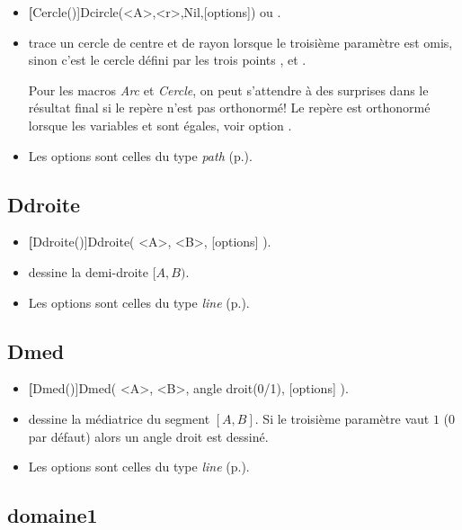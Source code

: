 \begin{itemize}
 \item \util \textbf[Cercle()]{Dcircle(<A>,<r>,Nil,[options])} ou .
 \item \desc trace un cercle de centre  et de rayon  lorsque le troisième paramètre est omis, sinon c'est le cercle défini par les trois points ,  et .

 Pour les macros \emph{Arc} et \emph{Cercle}, on peut s'attendre à des surprises dans le résultat final si le repère n'est pas orthonormé! Le repère est orthonormé lorsque les variables  et  sont égales, voir option .
 \item Les options sont celles du type \emph{path} (p.\pageref{typepath}).
\end{itemize}


\subsection{Ddroite}

\begin{itemize}
 \item \util \textbf[Ddroite()]{Ddroite( <A>, <B>, [options] )}.
 \item \desc dessine la demi-droite $[A,B)$.
 \item Les options sont celles du type \emph{line} (p.\pageref{typeline}).
\end{itemize} 

\subsection{Dmed}

\begin{itemize}
 \item \util \textbf[Dmed()]{Dmed( <A>, <B>, angle droit(0/1), [options] )}.
 \item \desc dessine la médiatrice du segment $[A,B]$. Si le troisième paramètre vaut $1$ ($0$ par défaut) alors un angle droit est dessiné.
 \item Les options sont celles du type \emph{line} (p.\pageref{typeline}).
\end{itemize} 


\subsection{domaine1}

